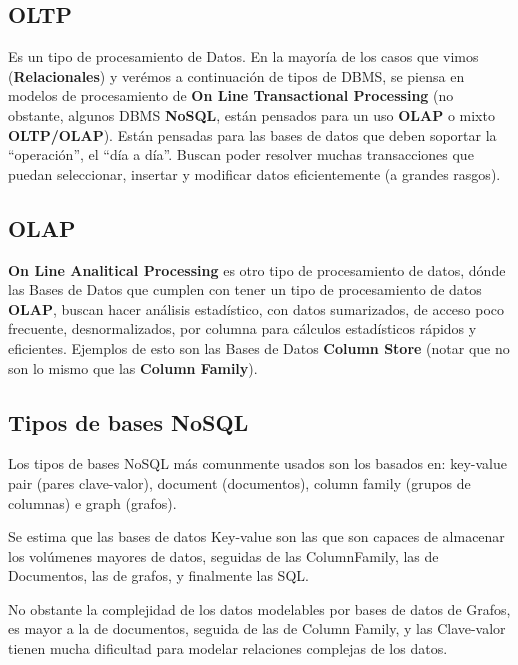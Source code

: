 \hypertarget{oltp}{}
\subsection*{OLTP} 
Es un tipo de procesamiento de Datos. En la mayoría de los casos que vimos (\textbf{Relacionales}) y verémos a continuación de tipos de DBMS, se piensa en modelos de procesamiento de \textbf{On Line Transactional Processing} (no obstante, algunos DBMS \textbf{NoSQL}, están pensados para un uso \textbf{OLAP} o mixto \textbf{OLTP/OLAP}). Están pensadas para las bases de datos que deben soportar la ``operación'', el ``día a día''. Buscan poder resolver muchas transacciones que puedan seleccionar, insertar y modificar datos eficientemente (a grandes rasgos).

\hypertarget{olap}{}
\subsection*{OLAP}
\textbf{On Line Analitical Processing} 
es otro tipo de procesamiento de datos, dónde las Bases de Datos que cumplen con tener un tipo de procesamiento de datos \textbf{OLAP}, buscan hacer análisis estadístico, con datos sumarizados, de acceso poco frecuente, desnormalizados, por columna para cálculos estadísticos rápidos y eficientes. Ejemplos de esto son las Bases de Datos \textbf{Column Store} (notar que no son lo mismo que las \textbf{Column Family}).

\subsection*{Tipos de bases NoSQL}
Los tipos de bases NoSQL más comunmente usados son los basados en: key-value pair (pares clave-valor), document (documentos), column family (grupos de columnas) e graph (grafos).

Se estima que las bases de datos Key-value son las que son capaces de almacenar los volúmenes mayores de datos, seguidas de las ColumnFamily, las de Documentos, las de grafos, y finalmente las SQL.

No obstante la complejidad de los datos modelables por bases de datos de Grafos, es mayor a la de documentos, seguida de las de Column Family, y las Clave-valor tienen mucha dificultad para modelar relaciones complejas de los datos.

